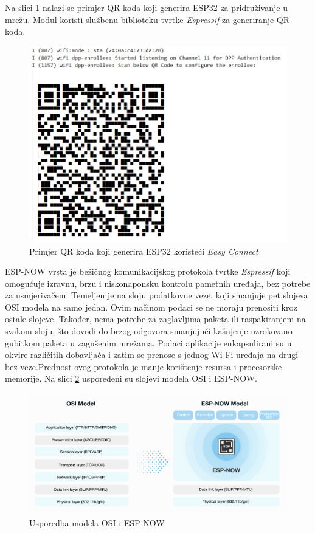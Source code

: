 Na slici \ref{fig:easy_connect} nalazi se primjer QR koda koji generira ESP32 za pridruživanje u mrežu. Modul koristi službenu biblioteku tvrtke \textit{Espressif} za generiranje QR koda. 

\begin{figure}[ht]
	\centering
	\includegraphics[scale=0.5]{imgs/easy_connect}
	\caption{Primjer QR koda koji generira ESP32 koristeći \textit{Easy Connect}}
	\label{fig:easy_connect}
\end{figure}

ESP-NOW vrsta je bežičnog komunikacijskog protokola tvrtke \textit{Espressif} koji omogućuje izravnu, brzu i niskonaponsku kontrolu pametnih uređaja, bez potrebe za usmjerivačem. Temeljen je na sloju podatkovne veze, koji smanjuje pet slojeva OSI modela na samo jedan. Ovim načinom podaci se ne moraju prenositi kroz ostale slojeve. Također, nema potrebe za zaglavljima paketa ili raspakiranjem na svakom sloju, što dovodi do brzog odgovora smanjujući kašnjenje uzrokovano gubitkom paketa u zagušenim mrežama. Podaci aplikacije enkapsulirani su u okvire različitih dobavljača i zatim se prenose s jednog Wi-Fi uređaja na drugi bez veze.Prednost ovog protokola je manje korištenje resursa i procesorske memorije. Na slici \ref{fig:esp_now} uspoređeni su slojevi modela OSI i ESP-NOW. 

\begin{figure}[ht]
	\centering
	\includegraphics[scale=0.2]{imgs/esp_now}
	\caption{Usporedba modela OSI i ESP-NOW \cite{esp_now}}
	\label{fig:esp_now}
\end{figure}

